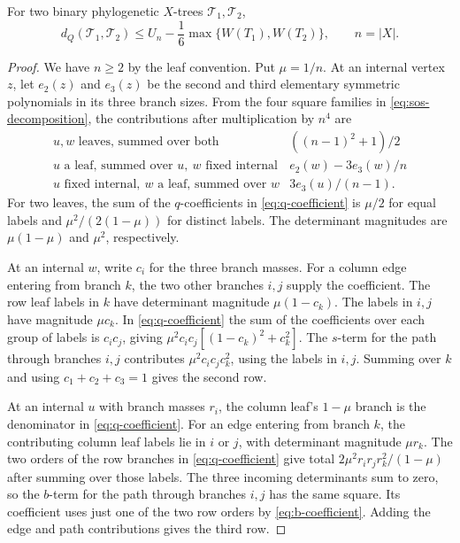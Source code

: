 \documentclass[12pt]{article}
\begin{document}
\begin{theorem}\label{thm:shape-bound}
For two binary phylogenetic $X$-trees $\mathcal T_1,\mathcal T_2$,
\[
 d_Q(\mathcal T_1,\mathcal T_2)\le
 U_n-\frac16\max\{W(T_1),W(T_2)\},\qquad n=|X|.
\]
\end{theorem}

\begin{proof}
We have $n\ge2$ by the leaf convention. Put $\mu=1/n$. At an internal
vertex $z$, let $e_2(z)$ and $e_3(z)$ be
the second and third elementary symmetric polynomials in its three
branch sizes. From the four square families in
\eqref{eq:sos-decomposition}, the contributions after multiplication by
$n^4$ are
\[
\begin{array}{ll}
u,w\text{ leaves, summed over both} & ((n-1)^2+1)/2\\
u\text{ a leaf, summed over }u,\ w\text{ fixed internal}
  & e_2(w)-3e_3(w)/n\\
u\text{ fixed internal},\ w\text{ a leaf, summed over }w
  & 3e_3(u)/(n-1).
\end{array}
\]
For two leaves, the sum of the $q$-coefficients in
\eqref{eq:q-coefficient} is $\mu/2$ for equal labels and
$\mu^2/(2(1-\mu))$ for distinct labels. The determinant magnitudes
are $\mu(1-\mu)$ and $\mu^2$, respectively.

At an internal $w$, write $c_i$ for the three branch masses. For a
column edge entering from branch $k$, the two other branches $i,j$
supply the coefficient. The row leaf labels in $k$ have determinant
magnitude $\mu(1-c_k)$. The labels in $i,j$ have magnitude $\mu c_k$.
In \eqref{eq:q-coefficient} the sum of the coefficients over each
group of labels is $c_ic_j$, giving
$\mu^2c_ic_j[(1-c_k)^2+c_k^2]$.
The $s$-term for the path through branches $i,j$ contributes
$\mu^2c_ic_jc_k^2$, using the labels in $i,j$. Summing over $k$
and using $c_1+c_2+c_3=1$ gives the second row.

At an internal $u$ with branch masses $r_i$, the column leaf's
$1-\mu$ branch is the denominator in \eqref{eq:q-coefficient}.
For an edge entering from branch $k$, the contributing column leaf
labels lie in $i$ or $j$, with determinant magnitude $\mu r_k$.
The two orders of the row branches in \eqref{eq:q-coefficient}
give total $2\mu^2r_ir_jr_k^2/(1-\mu)$ after summing over those labels.
The three incoming determinants sum to zero, so the $b$-term for
the path through branches $i,j$ has the same square. Its coefficient
uses just one of the two row orders by \eqref{eq:b-coefficient}.
Adding the edge and path contributions gives the third row.


\end{proof}
\end{document}
